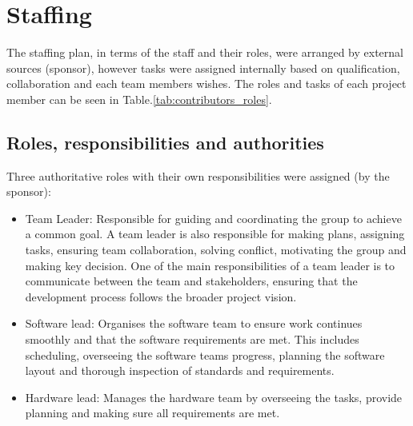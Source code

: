 \section{Staffing}
\label{section:staffing}

The staffing plan, in terms of the staff and their roles, were arranged by external sources (sponsor), however tasks were assigned internally based on qualification, collaboration and each team members wishes. The roles and tasks of each project member can be seen in Table.\:\ref{tab:contributors_roles}.



\subsection{Roles, responsibilities and authorities}
\label{section:staffing_roles_responsibilities_and_authorities}

Three authoritative roles with their own responsibilities were assigned (by the sponsor):
\begin{itemize}
    \item Team Leader: Responsible for guiding and coordinating the group to achieve a common goal. A team leader is also responsible for making plans, assigning tasks, ensuring team collaboration, solving conflict, motivating the group and making key decision. One of the main responsibilities of a team leader is to communicate between the team and stakeholders, ensuring that the development process follows the broader project vision.  
    \item Software lead: Organises the software team to ensure work continues smoothly and that the software requirements are met. This includes scheduling, overseeing the software teams progress, planning the software layout and thorough inspection of standards and requirements. 
    \item Hardware lead: Manages the hardware team by overseeing the tasks, provide planning and making sure all requirements are met.
\end{itemize}

